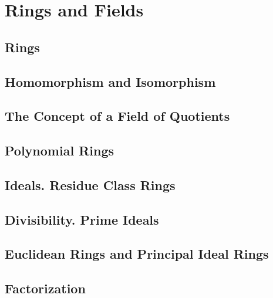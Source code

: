 \section{Rings and Fields}

\subsection{Rings}

\subsection{Homomorphism and Isomorphism}

\subsection{The Concept of a Field of Quotients}

\subsection{Polynomial Rings}

\subsection{Ideals. Residue Class Rings}

\subsection{Divisibility. Prime Ideals}

\subsection{Euclidean Rings and Principal Ideal Rings}

\subsection{Factorization}


